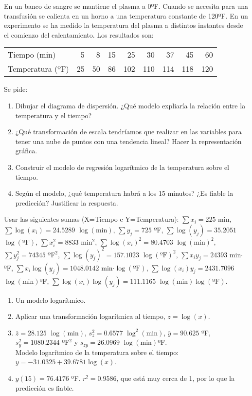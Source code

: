 {En un banco de sangre se mantiene el plasma a 0ºF.
Cuando se necesita para una transfusión se calienta en un horno a una temperatura constante de 120ºF.
En un experimento se ha medido la temperatura del plasma a distintos instantes desde el comienzo del calentamiento.
Los resultados son: 
\begin{center}
\begin{tabular}{lrrrrrrrr}
\toprule
Tiempo (min)	& 5 & 8 & 15 & 25 & 30 & 37 & 45 & 60\\
Temperatura (ºF) & 25 & 50 & 86 & 102 & 110 & 114 & 118 & 120\\
\bottomrule
\end{tabular}
\end{center}
Se pide:
\begin{enumerate}
\item Dibujar el diagrama de dispersión. ¿Qué modelo expliaría la relación entre la temperatura y el tiempo?
\item ¿Qué transformación de escala tendríamos que realizar en las variables para tener una nube de puntos con una
tendencia lineal?
Hacer la representación gráfica. 
\item Construir el modelo de regresión logarítmico de la temperatura sobre el tiempo.
\item Según el modelo, ¿qué temperatura habrá a los 15 minutos?
¿Es fiable la predicción?
Justificar la respuesta.
\end{enumerate}
Usar las siguientes sumas (X=Tiempo e Y=Temperatura): $\sum x_i=225$ min, $\sum \log(x_i)=24.5289$ $\log(\mbox{min})$, $\sum y_j=725$ ºF, $\sum \log(y_j)=35.2051$ $\log(\mbox{ºF})$, $\sum x_i^2=8833$ min$^2$, $\sum \log(x_i)^2=80.4703$ $\log(\mbox{min})^2$, $\sum y_j^2=74345$ ºF$^2$, $\sum \log(y_j)^2=157.1023$ $\log(\mbox{ºF})^2$, $\sum x_iy_j=24393$ min$\cdot$ºF, $\sum x_i\log(y_j)=1048.0142$ min$\cdot \log(\mbox{ºF})$, $\sum \log(x_i)y_j=2431.7096$ $\log(\mbox{min})$ºF, $\sum \log(x_i)\log(y_j)=111.1165$ $\log(\mbox{min})\log(\mbox{ºF})$.
}
{
\begin{enumerate}
\item Un modelo logarítmico.
\item Aplicar una transformación logarítmica al tiempo, $z=\log(x)$.
\item $\bar z=28.125$ $\log(\mbox{min})$, $s_z^2=0.6577$ $\log^2(\mbox{min})$, $\bar y=90.625$ ºF, $s_y^2=1080.2344$ ºF$^2$ y $s_{zy}=26.0969$ $\log(\mbox{min})$ºF.\\
Modelo logarítmico de la temperatura sobre el tiempo: $y=-31.0325+39.6781\log(x)$.
\item $y(15)=76.4176$ ºF. $r^2=0.9586$, que está muy cerca de 1, por lo que la predicción es fiable.
\end{enumerate}
}
{}


